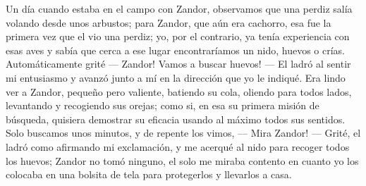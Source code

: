 Un día cuando estaba en el campo con Zandor, observamos que una perdiz salía volando desde unos arbustos; para Zandor, que aún era cachorro, esa fue la primera vez que el vio una perdiz; yo, por el contrario, ya tenía experiencia con esas aves y sabía que cerca a ese lugar encontraríamos un nido, huevos o crías.
Automáticamente grité --- Zandor! Vamos a buscar huevos! --- El ladró al sentir mi entusiasmo y avanzó junto a mí en la dirección que yo le indiqué.
Era lindo ver a Zandor, pequeño pero valiente, batiendo su cola, oliendo para todos lados, levantando y recogiendo sus orejas; como si, en esa su primera misión de búsqueda, quisiera demostrar su eficacia usando al máximo todos sus sentidos.
Solo buscamos unos minutos, y de repente los vimos, --- Mira Zandor! --- Grité, el ladró como afirmando mi exclamación, y me acerqué al nido para recoger todos los huevos; Zandor no tomó ninguno, el solo me miraba contento en cuanto yo los colocaba en una bolsita de tela para protegerlos y llevarlos a casa.

